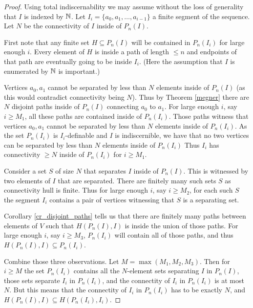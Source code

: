 \begin{proof}
  Using total indiscernability we may assume without the loss of generality that $I$ is indexed by $\mathbb{N}$.
  Let $I_i = \{a_0, a_1, \ldots, a_{i-1}\}$ a finite segment of the sequence.
  Let $N$ be the connectivity of $I$ inside of $P_n(I)$.

  First note that any finite set $H \subseteq P_n(I)$ will be contained in $P_n(I_i)$ for large enough $i$.
  Every element of $H$ is inside a path of length $\leq n$ and endpoints of that path are eventually going to be inside $I_i$.
  (Here the assumption that $I$ is enumerated by $\mathbb{N}$ is important.)

  Vertices $a_0, a_1$ cannot be separated by less than $N$ elements inside of $P_n(I)$
  (as this would contradict connectivity being $N$).
  Thus by Theorem \ref{megner} there are $N$ disjoint paths inside of $P_n(I)$ connecting $a_0$ to $a_1$.
  For large enough $i$, say $i \geq M_1$, all these paths are contained inside of $P_n(I_i)$.
  Those paths witness that vertices $a_0, a_1$ cannot be separated by less than $N$ elements inside of $P_n(I_i)$.
  As the set $P_n(I_i)$ is $I_i$-definable and $I$ is indiscernible,
  we have that no two vertices can be separated by less than $N$ elements inside of $P_n(I_i)$
  Thus $I_i$ has connectivity $\geq N$ inside of $P_n(I_i)$ for $i \geq M_1$.

  Consider a set $S$ of size $N$ that separates $I$ inside of $P_n(I)$.
  This is witnessed by two elements of $I$ that are separated.
  There are finitely many such sets $S$ as connectivity hull is finite.
  Thus for large enough $i$, say $i \geq M_2$, for each such $S$
  the segment $I_i$ contains a pair of vertices witnessing that $S$ is a separating set.

  Corollary \ref{cr_disjoint_paths} tells us that there are finitely many paths between elements of $V$ such that
  $H(P_n(I), I)$ is inside the union of those paths.
  For large enough $i$, say $i \geq M_3$, $P_n(I_i)$ will contain all of those paths, and thus $H(P_n(I), I) \subseteq P_n(I_i)$.

  Combine those three observations.
  Let $M = \max(M_1, M_2, M_3)$.
  Then for $i \geq M$ the set $P_n(I_i)$ contains all the $N$-element sets separating $I$ in $P_n(I)$,
  those sets separate $I_i$ in $P_n(I_i)$,
  and the connectity of $I_i$ in $P_n(I_i)$ is at most $N$.
  But this means that the connectity of $I_i$ in $P_n(I_i)$ has to be exactly $N$, and $H(P_n(I), I) \subseteq H(P_n(I_i), I_i)$.


\end{proof}
